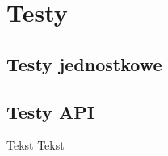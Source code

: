 \chapter{Testy}
\label{ch:Testy}
\section{Testy jednostkowe}
\section{Testy API}
Tekst\newline
Tekst
